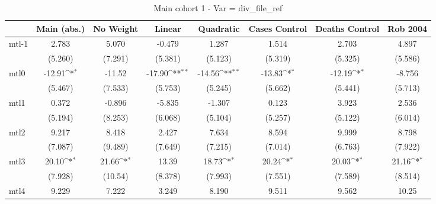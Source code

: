 \documentclass{article}
\begin{document}
{
\def\sym#1{\ifmmode^{#1}\else\(^{#1}\)\fi}
\begin{longtable}{l*{7}{c}}
\caption{Main cohort 1 - Var = div\_file\_ref}\\
\hline\hline\endfirsthead\hline\endhead\hline\endfoot\endlastfoot
                &\multicolumn{1}{c}{Main (abs.)}&\multicolumn{1}{c}{No Weight}&\multicolumn{1}{c}{Linear}&\multicolumn{1}{c}{Quadratic}&\multicolumn{1}{c}{Cases Control}&\multicolumn{1}{c}{Deaths Control}&\multicolumn{1}{c}{Rob 2004}\\
\hline
mtl-1           &    2.783         &    5.070         &   -0.479         &    1.287         &    1.514         &    2.703         &    4.897         \\
                &  (5.260)         &  (7.291)         &  (5.381)         &  (5.123)         &  (5.319)         &  (5.325)         &  (5.586)         \\
mtl0            &   -12.91\sym{*}  &   -11.52         &   -17.90\sym{**} &   -14.56\sym{**} &   -13.83\sym{*}  &   -12.19\sym{*}  &   -8.756         \\
                &  (5.467)         &  (7.533)         &  (5.753)         &  (5.245)         &  (5.662)         &  (5.441)         &  (5.713)         \\
mtl1            &    0.372         &   -0.896         &   -5.835         &   -1.307         &    0.123         &    3.923         &    2.536         \\
                &  (5.194)         &  (8.253)         &  (6.068)         &  (5.104)         &  (5.257)         &  (5.122)         &  (6.014)         \\
mtl2            &    9.217         &    8.418         &    2.427         &    7.634         &    8.594         &    9.999         &    8.798         \\
                &  (7.087)         &  (9.489)         &  (7.649)         &  (7.215)         &  (7.014)         &  (6.763)         &  (7.922)         \\
mtl3            &    20.10\sym{*}  &    21.66\sym{*}  &    13.39         &    18.73\sym{*}  &    20.24\sym{*}  &    20.03\sym{*}  &    21.16\sym{*}  \\
                &  (7.928)         &  (10.54)         &  (8.378)         &  (7.993)         &  (7.551)         &  (7.589)         &  (8.514)         \\
mtl4            &    9.229         &    7.222         &    3.249         &    8.190         &    9.511         &    9.562         &    10.25         \\

\end{longtable}}
\end{document}
